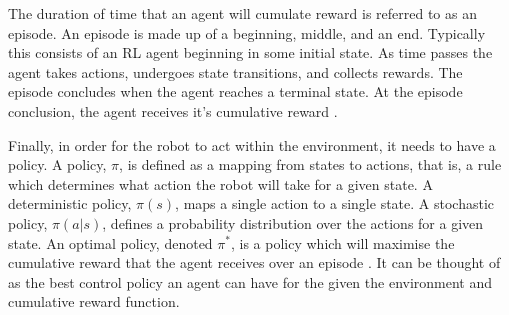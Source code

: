The duration of time that an agent will cumulate reward is referred to as an episode. An episode is made up of a beginning, middle, and an end. Typically this consists of an RL agent beginning in some initial state. As time passes the agent takes actions, undergoes state transitions, and collects rewards. The episode concludes when the agent reaches a terminal state. At the episode conclusion, the agent receives it's cumulative reward \cite{Kaelbling1996}.

Finally, in order for the robot to act within the environment, it needs to have a policy. A policy, $\pi$, is defined as a mapping from states to actions, that is, a rule which determines what action the robot will take for a given state. A deterministic policy, $\pi (s)$, maps a single action to a single state. A stochastic policy, $\pi (a | s)$, defines a probability distribution over the actions for a given state. An optimal policy, denoted $\pi^*$, is a policy which will maximise the cumulative reward that the agent receives over an episode \cite{Bellm1954}. It can be thought of as the best control policy an agent can have for the given the environment and cumulative reward function.

